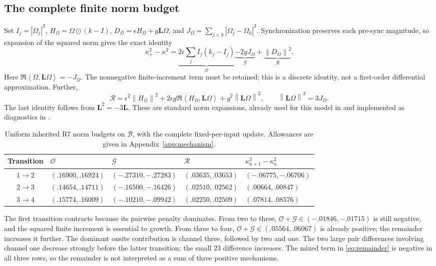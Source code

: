 \documentclass[11pt,a4paper]{article}
\numberwithin{equation}{section}
\newcommand{\norm}[1]{\left\lVert#1\right\rVert}
\newcommand{\ip}[2]{\left\langle#1,#2\right\rangle}
\newcommand{\Lmat}{\mathbf L}
\newcommand{\boxinput}{\mathcal B}
\begin{document}
\subsection{The complete finite norm budget}
Set $I_j=|\Omega_j|^2$, $H_\Omega=\Omega\odot(k-I)$,
$D_\Omega=\epsilon H_\Omega+g\Lmat\Omega$, and
$J_\Omega=\sum_{j<k}|\Omega_j-\Omega_k|^2$. Synchronization preserves each
pre-sync magnitude, so expansion of the squared norm gives the exact identity
\begin{equation}\label{eq:normbudget}
\kappa_+^2-\kappa^2
=\underbrace{2\epsilon\sum_j I_j(k_j-I_j)}_{\mathcal O}
\underbrace{-2gJ_\Omega}_{\mathcal G}
+\underbrace{\norm{D_\Omega}^2}_{\mathcal R}.
\end{equation}
Here $\Re\ip{\Omega}{\Lmat\Omega}=-J_\Omega$.
The nonnegative finite-increment term must be retained; this is a discrete
identity, not a first-order differential approximation. Further,
\begin{equation}\label{eq:remainder}
\mathcal R=\epsilon^2\norm{H_\Omega}^2+
2\epsilon g\Re\ip{H_\Omega}{\Lmat\Omega}
+g^2\norm{\Lmat\Omega}^2,\qquad
\norm{\Lmat\Omega}^2=3J_\Omega .
\end{equation}
The last identity follows from $\Lmat^2=-3\Lmat$.
These are standard norm expansions, already used for this model in
\cite[Section 17]{PaperE} and implemented as diagnostics in \cite{Native}.

\begin{table}[htbp]
\centering\small
\begin{tabular}{@{}cllll@{}}
\toprule
Transition&$\mathcal O$&$\mathcal G$&$\mathcal R$&
$\kappa_{n+1}^2-\kappa_n^2$\\ \midrule
$1\to2$&$(.16900,.16924)$&$(-.27310,-.27283)$&$(.03635,.03653)$&
$(-.06775,-.06706)$\\
$2\to3$&$(.14654,.14711)$&$(-.16500,-.16426)$&$(.02510,.02562)$&
$(.00664,.00847)$\\
$3\to4$&$(.15774,.16009)$&$(-.10210,-.09942)$&$(.02250,.02509)$&
$(.07814,.08576)$\\
\bottomrule
\end{tabular}
\caption{Uniform inherited R7 norm budgets on $\boxinput$, with the complete
fixed-per-input update. Allowances are given in Appendix~\ref{app:mechanism}.}
\label{tab:budget}
\end{table}

The first transition contracts because its pairwise penalty dominates.
From two to three, $\mathcal O+\mathcal G\in(-.01846,-.01715)$ is still
negative, and the squared finite increment is essential to growth.
From three to four, $\mathcal O+\mathcal G\in(.05564,.06067)$ is already
positive; the remainder increases it further. The dominant onsite
contribution is channel three, followed by two and one. The two large
pair differences involving channel one decrease strongly before the latter
transition; the small $23$ difference increases. The mixed term in
\eqref{eq:remainder} is negative in all three rows, so the remainder is not
interpreted as a sum of three positive mechanisms.
\end{document}
